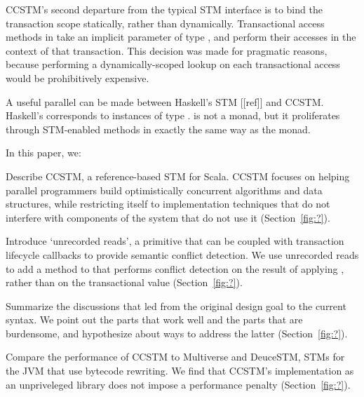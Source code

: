 CCSTM's second departure from the typical STM interface is to bind the
transaction scope statically, rather than dynamically.  Transactional access
methods in  take an implicit parameter of type , and
perform their accesses in the context of that transaction.  This decision
was made for pragmatic reasons, because performing a dynamically-scoped
lookup on each transactional access would be prohibitively expensive.

A useful parallel can be made between Haskell's STM [[ref]] and CCSTM.
Haskell's  corresponds to instances of type .
 is not a monad, but it proliferates through STM-enabled
methods in exactly the same way as the  monad.

In this paper, we:
\begin{packed_enum}

\item Describe CCSTM, a reference-based STM for Scala.  CCSTM focuses on
helping parallel programmers build optimistically concurrent algorithms
and data structures, while restricting itself to implementation techniques
that do not interfere with components of the system that do not use it
(Section~\ref{fig:?}).

\item Introduce `unrecorded reads', a primitive that can be coupled with
transaction lifecycle callbacks to provide semantic conflict detection.  We use
unrecorded reads to add a  method to  that performs
conflict detection on the result of applying , rather than on the
transactional value (Section~\ref{fig:?}).

\item Summarize the discussions that led from the original design goal to
the current syntax.  We point out the parts that work well and the parts that
are burdensome, and hypothesize about ways to address the latter
(Section~\ref{fig:?}).

\item Compare the performance of CCSTM to Multiverse and DeuceSTM, STMs for
the JVM that use bytecode rewriting.  We find that CCSTM's implementation as an
unpriveleged library does not impose a performance penalty
(Section~\ref{fig:?}).  

\end{packed_enum}

